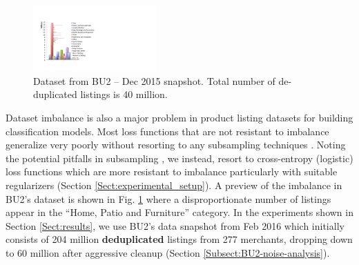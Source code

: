 \begin{figure}
	\centering
	\vspace{-0.5cm}
	\includegraphics[width=0.42\textwidth]{images/BU2-dataset-Dec2015}
	\vspace{-0.6cm}
	\caption{{\small Dataset from BU2 -- Dec 2015 snapshot. Total number of de-duplicated listings is 40 million.}}
	\vspace{-0.5cm}
	\label{Figure_BU2-datset-earlier}
\end{figure}
Dataset imbalance is also a major problem in product listing datasets for building classification models.
Most loss functions that are not resistant to imbalance generalize very poorly without resorting to any subsampling techniques \cite{Chawla02:SMOTE}. 
Noting the potential pitfalls in subsampling \cite{Sun14}, we instead, resort to cross-entropy (logistic) loss functions which are more resistant to imbalance particularly with suitable regularizers (Section \ref{Sect:experimental_setup}). 
A preview of the imbalance in BU2's dataset is shown in Fig. \ref{Figure_BU2-datset-earlier} where a disproportionate number of listings appear in the ``Home, Patio and Furniture'' category.
In the experiments shown in Section \ref{Sect:results}, we use BU2's data snapshot from Feb 2016 which initially consists of 204 million \textbf{deduplicated} listings from 277 merchants, dropping down to 60 million after aggressive cleanup (Section \ref{Subsect:BU2-noise-analysis}).


